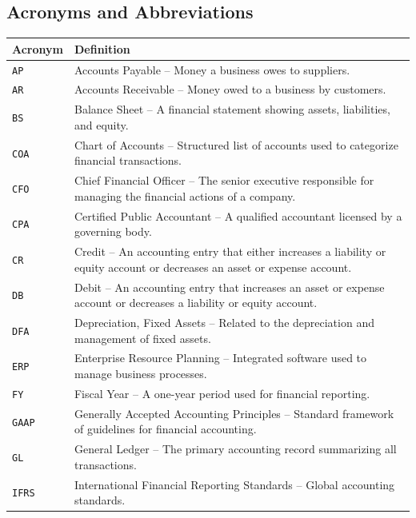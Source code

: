 \documentclass[11pt,a4paper]{article}
\begin{document}
\subsection{Acronyms and Abbreviations}
\begin{longtable}{|l|p{13cm}|}
    \hline
    \textbf{Acronym} & \textbf{Definition} \\
    \hline
    \texttt{AP} & Accounts Payable – Money a business owes to suppliers. \\
    \hline
    \texttt{AR} & Accounts Receivable – Money owed to a business by customers. \\
    \hline
    \texttt{BS} & Balance Sheet – A financial statement showing assets, liabilities, and equity. \\
    \hline
    \texttt{COA} & Chart of Accounts – Structured list of accounts used to categorize financial transactions. \\
    \hline
    \texttt{CFO} & Chief Financial Officer – The senior executive responsible for managing the financial actions of a company. \\
    \hline
    \texttt{CPA} & Certified Public Accountant – A qualified accountant licensed by a governing body. \\
    \hline
    \texttt{CR} & Credit – An accounting entry that either increases a liability or equity account or decreases an asset or expense account. \\
    \hline
    \texttt{DB} & Debit – An accounting entry that increases an asset or expense account or decreases a liability or equity account. \\
    \hline
    \texttt{DFA} & Depreciation, Fixed Assets – Related to the depreciation and management of fixed assets. \\
    \hline
    \texttt{ERP} & Enterprise Resource Planning – Integrated software used to manage business processes. \\
    \hline
    \texttt{FY} & Fiscal Year – A one-year period used for financial reporting. \\
    \hline
    \texttt{GAAP} & Generally Accepted Accounting Principles – Standard framework of guidelines for financial accounting. \\
    \hline
    \texttt{GL} & General Ledger – The primary accounting record summarizing all transactions. \\
    \hline
    \texttt{IFRS} & International Financial Reporting Standards – Global accounting standards. \\
    \hline

\end{longtable}
\end{document}
